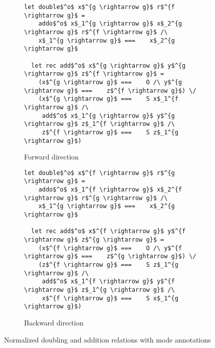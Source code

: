 \begin{figure}[h]
  \centering
  \begin{subfigure}[b]{0.45\textwidth}
    \begin{lstlisting}[frame=tb]
  let double$^o$ x$^{g \rightarrow g}$ r$^{f \rightarrow g}$ =
    addo$^o$ x$_1^{g \rightarrow g}$ x$_2^{g \rightarrow g}$ r$^{f \rightarrow g}$ /\
    x$_1^{g \rightarrow g}$ ===    x$_2^{g \rightarrow g}$

  let rec add$^o$ x$^{g \rightarrow g}$ y$^{g \rightarrow g}$ z$^{f \rightarrow g}$ =
    (x$^{g \rightarrow g}$ ===    O /\ y$^{g \rightarrow g}$ ===    z$^{f \rightarrow g}$) \/
    (x$^{g \rightarrow g}$ ===    S x$_1^{f \rightarrow g}$ /\
     add$^o$ x$_1^{g \rightarrow g}$ y$^{g \rightarrow g}$ z$_1^{f \rightarrow g}$ /\
     z$^{f \rightarrow g}$ ===    S z$_1^{g \rightarrow g}$)
    \end{lstlisting}
   \caption{Forward direction}
    \label{fig:double_fwd}
  \end{subfigure}
  \hfill
  \begin{subfigure}[b]{0.45\textwidth}
    \begin{lstlisting}[frame=tb]
  let double$^o$ x$^{f \rightarrow g}$ r$^{g \rightarrow g}$ =
    addo$^o$ x$_1^{f \rightarrow g}$ x$_2^{f \rightarrow g}$ r$^{g \rightarrow g}$ /\
    x$_1^{g \rightarrow g}$ ===    x$_2^{g \rightarrow g}$

  let rec add$^o$ x$^{f \rightarrow g}$ y$^{f \rightarrow g}$ z$^{g \rightarrow g}$ =
    (x$^{f \rightarrow g}$ ===    O /\ y$^{f \rightarrow g}$ ===    z$^{g \rightarrow g}$) \/
    (z$^{f \rightarrow g}$ ===    S z$_1^{g \rightarrow g}$ /\
     add$^o$ x$_1^{f \rightarrow g}$ y$^{f \rightarrow g}$ z$_1^{g \rightarrow g}$ /\
     x$^{f \rightarrow g}$ ===    S x$_1^{g \rightarrow g}$)
    \end{lstlisting}
    \caption{Backward direction}
    \label{fig:double_bw}
  \end{subfigure}
  \caption{Normalized doubling and addition relations with mode annotations}
  \label{fig:double_modded}
\end{figure}
